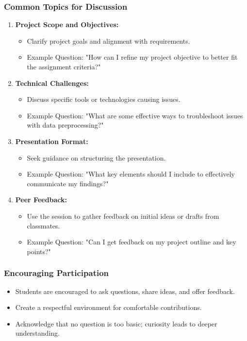 \documentclass[aspectratio=169]{beamer}
\begin{document}
\begin{frame}[fragile]
    \frametitle{Common Topics for Discussion}
    \begin{enumerate}
        \item \textbf{Project Scope and Objectives:}
            \begin{itemize}
                \item Clarify project goals and alignment with requirements.
                \item Example Question: "How can I refine my project objective to better fit the assignment criteria?"
            \end{itemize}
        \item \textbf{Technical Challenges:}
            \begin{itemize}
                \item Discuss specific tools or technologies causing issues.
                \item Example Question: "What are some effective ways to troubleshoot issues with data preprocessing?"
            \end{itemize}
        \item \textbf{Presentation Format:}
            \begin{itemize}
                \item Seek guidance on structuring the presentation.
                \item Example Question: "What key elements should I include to effectively communicate my findings?"
            \end{itemize}
        \item \textbf{Peer Feedback:}
            \begin{itemize}
                \item Use the session to gather feedback on initial ideas or drafts from classmates.
                \item Example Question: "Can I get feedback on my project outline and key points?"
            \end{itemize}
    \end{enumerate}
\end{frame}

\begin{frame}[fragile]
    \frametitle{Encouraging Participation}
    \begin{itemize}
        \item Students are encouraged to ask questions, share ideas, and offer feedback.
        \item Create a respectful environment for comfortable contributions.
        \item Acknowledge that no question is too basic; curiosity leads to deeper understanding.
    \end{itemize}
\end{frame}
\end{document}
